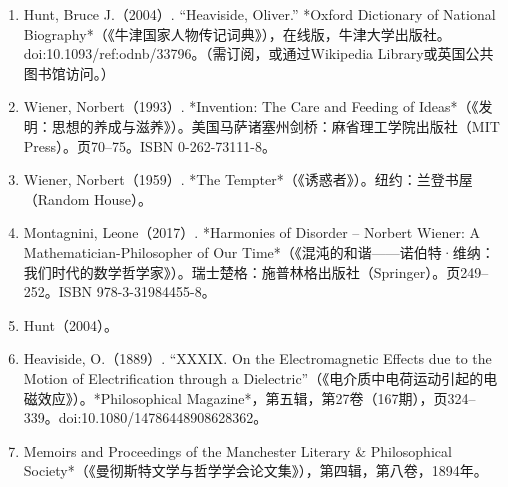 \begin{enumerate}
\item Hunt, Bruce J.（2004）. “Heaviside, Oliver.” *Oxford Dictionary of National Biography*（《牛津国家人物传记词典》），在线版，牛津大学出版社。doi:10.1093/ref:odnb/33796。（需订阅，或通过Wikipedia Library或英国公共图书馆访问。）
\item Wiener, Norbert（1993）. *Invention: The Care and Feeding of Ideas*（《发明：思想的养成与滋养》）。美国马萨诸塞州剑桥：麻省理工学院出版社（MIT Press）。页70–75。ISBN 0-262-73111-8。
\item Wiener, Norbert（1959）. *The Tempter*（《诱惑者》）。纽约：兰登书屋（Random House）。
\item Montagnini, Leone（2017）. *Harmonies of Disorder – Norbert Wiener: A Mathematician-Philosopher of Our Time*（《混沌的和谐——诺伯特·维纳：我们时代的数学哲学家》）。瑞士楚格：施普林格出版社（Springer）。页249–252。ISBN 978-3-31984455-8。
\item Hunt（2004）。
\item Heaviside, O.（1889）. “XXXIX. On the Electromagnetic Effects due to the Motion of Electrification through a Dielectric”（《电介质中电荷运动引起的电磁效应》）。*Philosophical Magazine*，第五辑，第27卷（167期），页324–339。doi:10.1080/14786448908628362。
\item Memoirs and Proceedings of the Manchester Literary & Philosophical Society*（《曼彻斯特文学与哲学学会论文集》），第四辑，第八卷，1894年。

\end{enumerate}